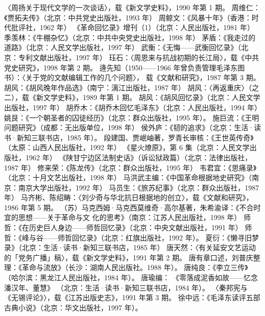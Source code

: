 \begin{thebibliography}{999}
\bibitem{} 〈周扬关于现代文学的一次谈话〉，载《新文学史料》，1990 年第 1 期。
\bibitem{} 周维仁：《贾拓夫传》（北京：中共党史出版社，1993 年）
\bibitem{} 周鲸文：《风暴十年》（香港：时代批评社，1962 年）
\bibitem{} 《革命回忆录》增刊（1）（北京：人民出版社，1981 年）
\bibitem{} 季羡林：《牛棚杂忆》（北京：中共中央党史出版社，1998 年）
\bibitem{} 茅盾：《我走过的道路》（北京：人民文学出版社，1997 年）
\bibitem{} 武衡：《无悔——武衡回忆录》（北京：专利文献出版社，1997 年）
\bibitem{} 珏石：〈周恩来与抗战初期的长江局〉，载《中共党史研究》，1998 年第 2 期。
\bibitem{} 逄先知（1950——1966 年曾负责管理毛泽东图书）：〈关于党的文献编辑工作的几个问题〉， 载《文献和研究》，1987 年第 3 期。
\bibitem{} 胡风：《胡风晚年作品选》（南宁：漓江出版社，1987 年）
\bibitem{} 胡风：〈再返重庆〉（之二），载《新文学史料》，1989 年第 1 期。
\bibitem{} 胡风：《胡风回忆录》（北京：人民文学出版社，1997 年）
\bibitem{} 胡乔木：《胡乔木回忆毛泽东》（北京：人民出版社，1994 年）
\bibitem{} 姚艮：《一个朝圣者的囚徒经历》（北京：群众出版社，1995 年）。
\bibitem{} 施巨流：《王明问题研究》（成都：无出版单位，1998 年）
\bibitem{} 侯外庐：《韧的追求》（北京：生活·读书·新知三联书店，1985 年）。
\bibitem{} 段建国、贾岷岫著，罗青长审核：《王世英传奇》（太原：山西人民出版社，1992 年）
\bibitem{} 《星火燎原》，第 6 集（北京：人民文学出版社，1962 年）
\bibitem{} 《陕甘宁边区法制史话》（诉讼狱政篇）（北京：法律出版社，1987 年）
\bibitem{} 修来荣：《陈龙传》（北京：群众出版社，1995 年）
\bibitem{} 韦君宜：《思痛录》（北京：十月文艺出版社，1998 年）
\bibitem{} 马洪武主编：《中国革命根据地史研究》（南京：南京大学出版社，1992 年）
\bibitem{} 马员生：《旅苏纪事》（北京：群众出版社，1987 年）
\bibitem{} 马齐彬、陈绍畴：〈刘少奇与华北抗日根据地的创立〉，载《文献和研究》，1986 年第 5 期。
\bibitem{} （苏）马克西姆·马克西莫维奇·高尔基著，朱希渝译：《不合时宜的思想——关于革命与文 化的思考》（南京：江苏人民出版社，1998 年）
\bibitem{} 师哲：《在历史巨人身边——师哲回忆录》（北京：中央文献出版社，1991 年）
\bibitem{} 师哲：《峰与谷——师哲回忆录》（北京：红旗出版社，1992 年）。
\bibitem{} 夏衍：《懒寻旧梦录》（北京：生活·读书·新知三联书店，1985 年）
\bibitem{} 唐天然：〈有关延安文艺运动的「党务广播」稿〉，载《新文学史料》，1991 年第 2 期。
\bibitem{} 唐有章口述，刘普庆整理：《革命与流放》（长沙：湖南人民出版社。1988 年）。
\bibitem{} 唐纯良：《李立三传》（哈尔滨：黑龙江人民出版社，1984 年）。
\bibitem{} 唐瑜编： 《零落成泥香如故——忆念潘汉年、董慧》 （北京：生活·读书·新知三联书店，1984 年）。
\bibitem{} 〈秦邦宪与《无锡评论》〉，载《江苏出版史志》，1991 年第 3 期。
\bibitem{} 徐中远：《毛泽东读评五部古典小说》（北京：华文出版社，1997 年）。

\end{thebibliography}
